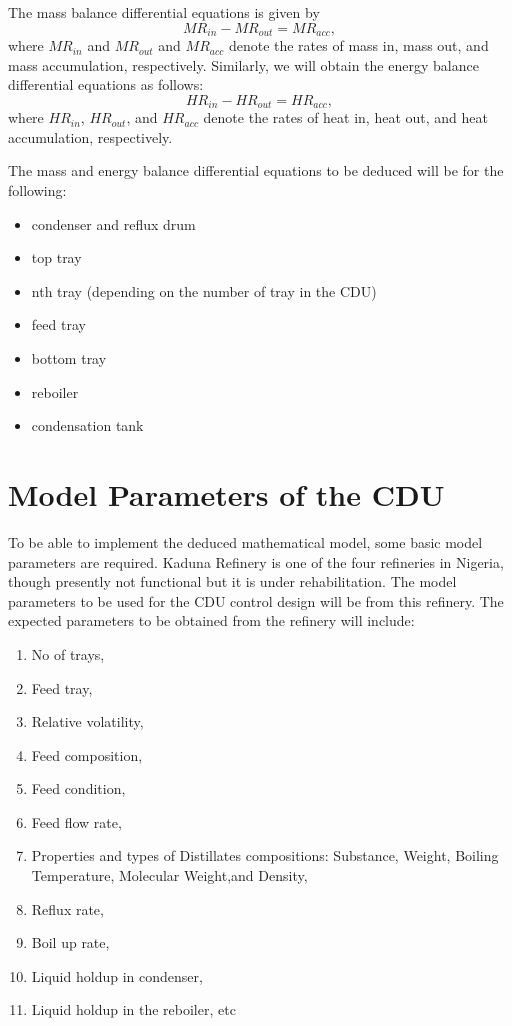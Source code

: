 \documentclass[11pt,a4paper,oneside]{article}
\begin{document}
The mass balance differential equations is given by
\begin{equation}
  \label{eq:mass_balance}
MR_{in} - MR_{out} = MR_{acc} ,
\end{equation}
where $MR_{in}$ and $MR_{out}$ and $MR_{acc}$ denote the rates of mass in, mass out, and mass accumulation, respectively.
Similarly, we will obtain the energy balance differential equations as follows:
\begin{equation}
  \label{eq:energy_balance}
HR_{in} - HR_{out} = HR_{acc} ,
\end{equation}
where $HR_{in}$, $HR_{out}$, and $HR_{acc}$ denote the rates of heat in, heat out, and heat accumulation, respectively.

The mass and energy balance differential equations to be deduced will be for the following:
\begin{itemize}
    \item condenser and reflux drum
    \item top tray
    \item nth tray (depending on the number of tray in the CDU)
    \item feed tray
    \item bottom tray
    \item reboiler
    \item condensation tank
\end{itemize}

\section{Model Parameters of the CDU}
To be able to implement the deduced mathematical model, some basic model parameters are required. Kaduna Refinery is one of the four refineries in Nigeria, though presently not functional but it is under rehabilitation. The model parameters to be used for the CDU control design will be from this refinery. The expected parameters to be obtained from the refinery will include:
\begin{enumerate}
  \item No of trays,
  \item Feed tray,
  \item Relative volatility,
  \item Feed composition,
  \item Feed condition,
  \item Feed flow rate,
  \item Properties and types of Distillates compositions: Substance, Weight, Boiling Temperature, Molecular
Weight,and Density,
    \item Reflux rate,
    \item Boil up rate,
    \item Liquid holdup in condenser,
    \item Liquid holdup in the reboiler, etc
\end{enumerate}
\end{document}

